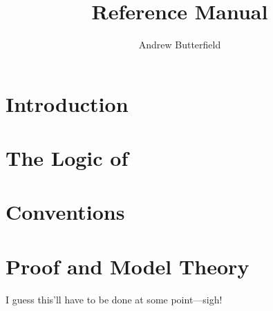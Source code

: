 \documentclass[fleqn]{report}
\author{
  Andrew Butterfield%
  }
\title{\UTP2
  Reference Manual
}
\begin{document}


\maketitle
\tableofcontents

\chapter{Introduction}




\chapter{The Logic of }



\chapter{Conventions}

\chapter{Proof and Model Theory}

I guess this'll have to be done at some point---sigh!





%

%
%
%
%
%
%
\end{document}
